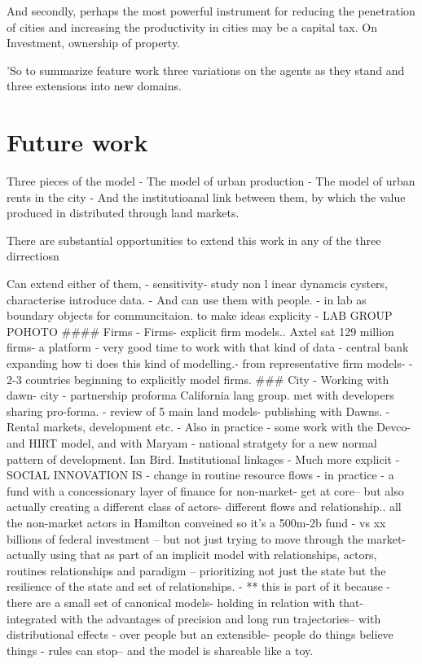 And secondly, perhaps the most powerful instrument for reducing the penetration of cities and increasing the productivity in cities may be a capital tax. On Investment, ownership of property.

'So to summarize feature work three variations on the agents as they stand and three extensions into new domains. 

\section{Future work}

Three pieces of the model 
- The model of urban production
- The model of urban rents in the city
- And the institutioanal link between them, by which the value produced in distributed through land markets.

There are substantial opportunities to extend this work in any of the three dirrectiosn

Can extend either of them,
- sensitivity- study non l inear dynamcis cysters, characterise introduce data.
- And can use them with people. - in lab as boundary objects for communcitaion. to make ideas explicity - LAB GROUP POHOTO
#### Firms
- Firms- explicit firm models.. Axtel sat 129 million firms- a platform - very good time to work with that kind of data
- central bank expanding how ti does this kind of modelling.- from representative firm models- - 2-3 countries beginning to explicitly model firms.
### City
- Working with dawn- city - partnership proforma California lang group. met with developers sharing pro-forma. - review of 5 main land models- publishing with Dawns. - Rental markets, development etc.
- Also in practice - some work with the Devco- and HIRT model, and with Maryam - national stratgety for a new normal pattern of development. Ian Bird.
Institutional linkages
- Much more explicit - SOCIAL INNOVATION IS - change in routine resource flows
- in practice - a fund with a concessionary layer of finance for non-market- get at core-- but also actually creating a different class of actors- different flows and relationship.. all the non-market actors in Hamilton conveined so it's a 500m-2b fund - vs xx billions of federal investment -- but not just trying to move through the market- actually using that as part of an implicit model with relationships, actors, routines relationships and paradigm -- prioritizing not just the state but the resilience of the state and set of relationships.
- ** this is part of it because - there are a small set of canonical models- holding in relation with that- integrated with the advantages of precision and long run trajectories-- with distributional effects - over people but an extensible- people do things believe things - rules can stop-- and the model is shareable like a toy.

